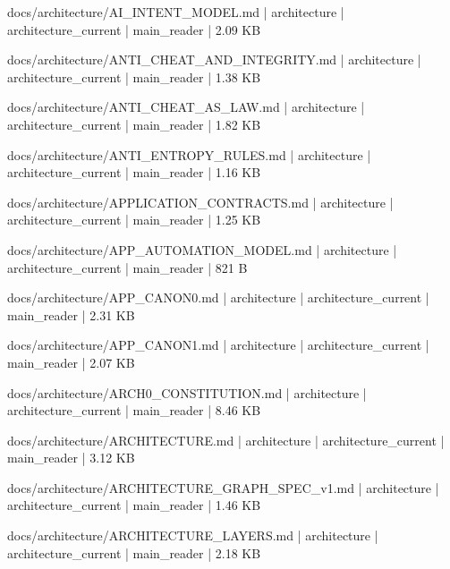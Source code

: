 \documentclass[11pt,a4paper]{report}
\begin{document}
{\small\ttfamily\raggedright docs/\allowbreak{}architecture/\allowbreak{}AI\_INTENT\_MODEL.\allowbreak{}md | architecture | architecture\_current | main\_reader | 2.\allowbreak{}09 KB\par}
{\small\ttfamily\raggedright docs/\allowbreak{}architecture/\allowbreak{}ANTI\_CHEAT\_AND\_INTEGRITY.\allowbreak{}md | architecture | architecture\_current | main\_reader | 1.\allowbreak{}38 KB\par}
{\small\ttfamily\raggedright docs/\allowbreak{}architecture/\allowbreak{}ANTI\_CHEAT\_AS\_LAW.\allowbreak{}md | architecture | architecture\_current | main\_reader | 1.\allowbreak{}82 KB\par}
{\small\ttfamily\raggedright docs/\allowbreak{}architecture/\allowbreak{}ANTI\_ENTROPY\_RULES.\allowbreak{}md | architecture | architecture\_current | main\_reader | 1.\allowbreak{}16 KB\par}
{\small\ttfamily\raggedright docs/\allowbreak{}architecture/\allowbreak{}APPLICATION\_CONTRACTS.\allowbreak{}md | architecture | architecture\_current | main\_reader | 1.\allowbreak{}25 KB\par}
{\small\ttfamily\raggedright docs/\allowbreak{}architecture/\allowbreak{}APP\_AUTOMATION\_MODEL.\allowbreak{}md | architecture | architecture\_current | main\_reader | 821 B\par}
{\small\ttfamily\raggedright docs/\allowbreak{}architecture/\allowbreak{}APP\_CANON0.\allowbreak{}md | architecture | architecture\_current | main\_reader | 2.\allowbreak{}31 KB\par}
{\small\ttfamily\raggedright docs/\allowbreak{}architecture/\allowbreak{}APP\_CANON1.\allowbreak{}md | architecture | architecture\_current | main\_reader | 2.\allowbreak{}07 KB\par}
{\small\ttfamily\raggedright docs/\allowbreak{}architecture/\allowbreak{}ARCH0\_CONSTITUTION.\allowbreak{}md | architecture | architecture\_current | main\_reader | 8.\allowbreak{}46 KB\par}
{\small\ttfamily\raggedright docs/\allowbreak{}architecture/\allowbreak{}ARCHITECTURE.\allowbreak{}md | architecture | architecture\_current | main\_reader | 3.\allowbreak{}12 KB\par}
{\small\ttfamily\raggedright docs/\allowbreak{}architecture/\allowbreak{}ARCHITECTURE\_GRAPH\_SPEC\_v1.\allowbreak{}md | architecture | architecture\_current | main\_reader | 1.\allowbreak{}46 KB\par}
{\small\ttfamily\raggedright docs/\allowbreak{}architecture/\allowbreak{}ARCHITECTURE\_LAYERS.\allowbreak{}md | architecture | architecture\_current | main\_reader | 2.\allowbreak{}18 KB\par}
\end{document}
